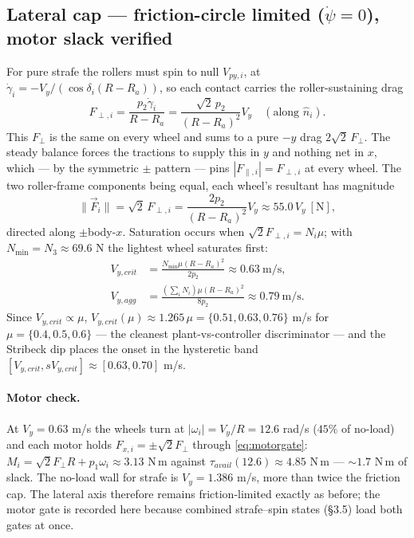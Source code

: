 \documentclass[11pt]{article}
\begin{document}
\subsection{Lateral cap --- friction-circle limited ($\dot\psi=0$), motor slack verified}
For pure strafe the rollers must spin to null $V_{py,i}$, at
$\dot\gamma_i=-V_y/(\cos\delta_i(R-R_a))$, so each contact carries the roller-sustaining drag
\begin{equation}
F_{\perp,i}=\frac{p_2\dot\gamma_i}{R-R_a}=\frac{\sqrt2\,p_2}{(R-R_a)^2}V_y\quad(\text{along }\hat n_i).
\end{equation}
This $F_\perp$ is the same on every wheel and sums to a pure $-y$ drag $2\sqrt2\,F_\perp$. The
steady balance forces the tractions to supply this in $y$ and nothing net in $x$, which --- by the
symmetric $\pm$ pattern --- pins $|F_{\parallel,i}|=F_{\perp,i}$ at every wheel. The two roller-frame
components being equal, each wheel's resultant has magnitude
\begin{equation}
\|\vec F_i\|=\sqrt2\,F_{\perp,i}=\frac{2p_2}{(R-R_a)^2}V_y\approx55.0\,V_y\ [\text{N}],
\end{equation}
directed along $\pm$body-$x$. Saturation occurs when $\sqrt2 F_{\perp,i}=N_i\mu$; with
$N_{\min}=N_3\approx69.6$ N the lightest wheel saturates first:
\begin{align}
V_{y,crit}&=\frac{N_{\min}\mu(R-R_a)^2}{2p_2}\approx0.63\ \text{m/s},\\
V_{y,agg}&=\frac{(\sum_iN_i)\mu(R-R_a)^2}{8p_2}\approx0.79\ \text{m/s}.
\end{align}
Since $V_{y,crit}\propto\mu$, $V_{y,crit}(\mu)\approx1.265\,\mu=\{0.51,0.63,0.76\}$ m/s for
$\mu=\{0.4,0.5,0.6\}$ --- the cleanest plant-vs-controller discriminator --- and the Stribeck dip
places the onset in the hysteretic band $[V_{y,crit},sV_{y,crit}]\approx[0.63,0.70]$ m/s.

\paragraph{Motor check.} At $V_y=0.63$ m/s the wheels turn at $|\omega_i|=V_y/R=12.6$ rad/s
($45\%$ of no-load) and each motor holds $F_{x,i}=\pm\sqrt2F_\perp$ through
\eqref{eq:motorgate}: $M_i=\sqrt2F_\perp R+p_1\omega_i\approx3.13$ N\,m against
$\tau_{avail}(12.6)\approx4.85$ N\,m --- $\sim1.7$ N\,m of slack. The no-load wall for strafe
is $V_y=1.386$ m/s, more than twice the friction cap. The lateral axis therefore remains
friction-limited exactly as before; the motor gate is recorded here because combined
strafe--spin states (\S3.5) load both gates at once.
\end{document}

